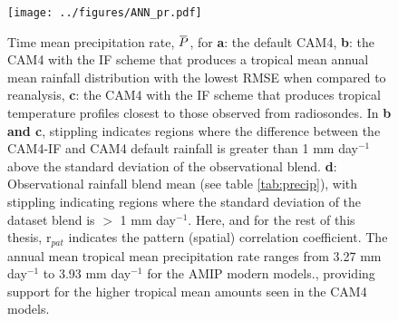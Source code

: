 \documentclass[letterpaper,12pt,titlepage,oneside,final]{book}
\newcommand{\overbar}[1]{\mkern 1.5mu\overline{\mkern-1.5mu#1\mkern-1.5mu}\mkern 1.5mu}
\begin{document}
\begin{figure}[H]
\centering
\noindent\texttt{[image: ../figures/ANN\_pr.pdf]}\hfill
\caption{Time mean precipitation rate, $\overbar{P}$, for \textbf{a}: the default CAM4, \textbf{b}: the CAM4 with the IF scheme that produces a tropical mean annual mean rainfall distribution with the lowest RMSE when compared to reanalysis, \textbf{c}: the CAM4 with the IF scheme that produces tropical temperature profiles closest to those observed from radiosondes. In \textbf{b and c}, stippling indicates regions where the difference between the CAM4-IF and CAM4 default rainfall is greater than 1 mm day$^{-1}$ above the standard deviation of the observational blend. \textbf{d}: Observational rainfall blend mean (see table \ref{tab:precip}), with stippling indicating regions where the standard deviation of the dataset blend is $>$ 1 mm day$^{-1}$. Here, and for the rest of this thesis, r$_{pat}$ indicates the pattern (spatial) correlation coefficient. The annual mean tropical mean precipitation rate ranges from 3.27 mm day$^{-1}$ to 3.93 mm day$^{-1}$  for the AMIP modern models., providing support for the higher tropical mean amounts seen in the CAM4 models.}
\label{fig:3.1}
\end{figure}
\end{document}
